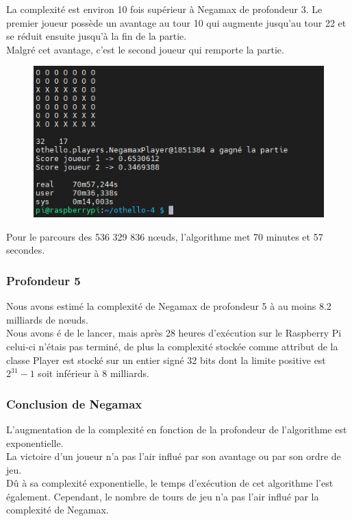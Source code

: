 \documentclass[12pt]{article}
\begin{document}
La complexité est environ 10 fois supérieur à Negamax de profondeur 3. Le premier joueur possède un avantage au tour 10 qui augmente jusqu’au tour 22 et se réduit ensuite jusqu’à la fin de la partie.\\
Malgré cet avantage, c’est le second joueur qui remporte la partie.
\newpage
\begin{figure}[!h]
   \includegraphics[width=\textwidth]{prof4negamax-console.png}
\end{figure}

Pour le parcours des 536 329 836 nœuds, l’algorithme met 70 minutes et 57 secondes. 

\subsubsection{Profondeur 5}

Nous avons estimé la complexité de Negamax de profondeur 5 à au moins 8.2 milliards de nœuds.\\
Nous avons é de le lancer, mais après 28 heures d’exécution sur le Raspberry Pi celui-ci n’étais pas terminé, de plus la complexité stockée comme attribut de la classe Player est stocké sur un entier signé 32 bits dont la limite positive est $2^{31} - 1$ soit inférieur à 8 milliards.
\newpage
\subsubsection{Conclusion de Negamax}

L’augmentation de la complexité en fonction de la profondeur de l’algorithme est exponentielle.\\
La victoire d’un joueur n’a pas l’air influé par son avantage ou par son ordre de jeu.\\
Dû à sa complexité exponentielle, le temps d’exécution de cet algorithme l’est également.
Cependant, le nombre de tours de jeu n'a pas l'air influé par la complexité de Negamax.
\end{document}
